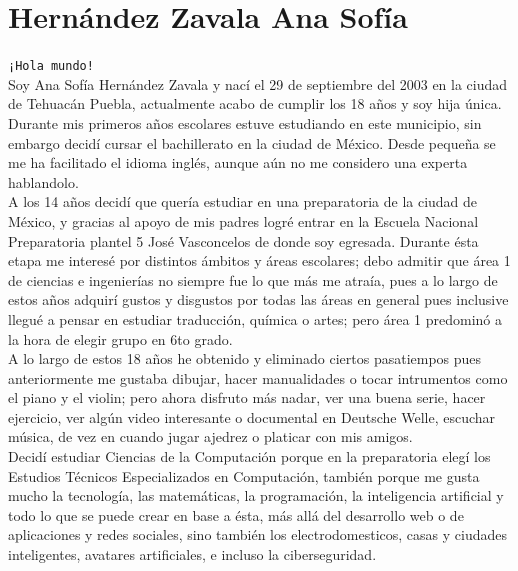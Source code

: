 \chapter{Hernández Zavala Ana Sofía}

{\Large \texttt{¡Hola mundo!}}\vspace*{1em} \\ 
Soy Ana Sofía Hernández Zavala y nací el 29 de septiembre del 2003 en la ciudad de Tehuacán Puebla, actualmente acabo de cumplir los 18 años y soy hija única. Durante mis primeros años escolares estuve estudiando en este municipio, sin embargo decidí cursar el bachillerato en la ciudad de México. Desde pequeña se me ha facilitado el idioma inglés, aunque aún no me considero una experta hablandolo.\vspace*{0.5em}\\
\indent A los 14 años decidí que quería estudiar en una preparatoria de la ciudad de México, y gracias al apoyo de mis padres logré entrar en la Escuela Nacional Preparatoria plantel 5 José Vasconcelos de donde soy egresada. Durante ésta etapa me interesé por distintos ámbitos y áreas escolares; debo admitir que área 1 de ciencias e ingenierías no siempre fue lo que más me atraía, pues a lo largo de estos años adquirí gustos y disgustos por todas las áreas en general pues inclusive llegué a pensar en estudiar traducción, química o artes; pero área 1 predominó a la hora de elegir grupo en 6to grado.\vspace*{0.5em}\\
\indent A lo largo de estos 18 años he obtenido y eliminado ciertos pasatiempos pues anteriormente me gustaba dibujar, hacer manualidades o tocar intrumentos como el piano y el violin; pero ahora disfruto más nadar, ver una buena serie, hacer ejercicio, ver algún video interesante o documental en Deutsche Welle, escuchar música, de vez en cuando jugar ajedrez o platicar con mis amigos.\vspace*{0.5em}\\
\indent Decidí estudiar Ciencias de la Computación porque en la preparatoria elegí los Estudios Técnicos Especializados en Computación, también porque me gusta mucho la tecnología, las matemáticas, la programación, la inteligencia artificial y todo lo que se puede crear en base a ésta, más allá del desarrollo web o de aplicaciones y redes sociales, sino también los electrodomesticos, casas y ciudades inteligentes, avatares artificiales, e incluso la ciberseguridad.\\

